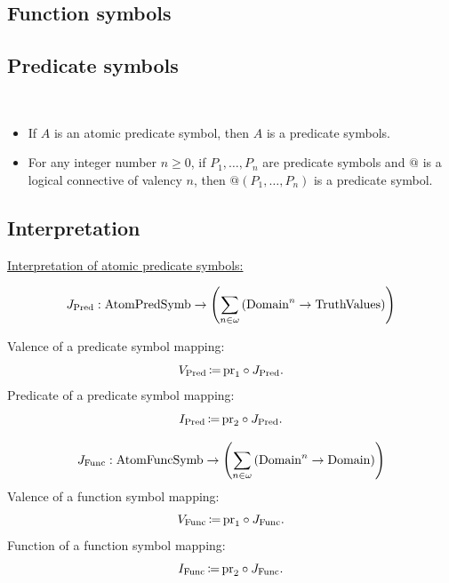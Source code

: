 \subsection{Function symbols}
\subsection{Predicate symbols}
\begin{definition}\ 
\begin{itemize}
\item If $A$ is an atomic predicate symbol, then $A$ is a predicate symbols.
\item For any integer number $n\geq 0$, if $P_1,\dots,P_n$ are predicate symbols and $@$ is a logical connective of valency $n$, then $@(P_1,\dots,P_n)$ is a predicate symbol.
\end{itemize}
\end{definition}

\subsection{Interpretation}
\underline{Interpretation of atomic predicate symbols:}
\begin{premise}%
\[
J_{\textrm{Pred}}:\mathrm{AtomPredSymb}\to\left(\sum_{n\in\omega}\left(\mathrm{Domain}^n\to\mathrm{TruthValues}\right)\right)
\]

Valence of a predicate symbol mapping:
\[
V_{\textrm{Pred}} \,{\coloneqq}\, \mathrm{pr}_1 \circ J_{\textrm{Pred}}.
\]
Predicate of a predicate symbol mapping:
\[
I_{\textrm{Pred}} \,{\coloneqq}\, \mathrm{pr}_2 \circ J_{\textrm{Pred}}.
\]
\end{premise}

\begin{premise}%
\[
J_{\textrm{Func}}:\mathrm{AtomFuncSymb}\to\left(\sum_{n\in\omega}
\left(\mathrm{Domain}^n
\to
\mathrm{Domain}
\right)
\right)
\]
Valence of a function symbol mapping:
\[
V_{\textrm{Func}} \,{\coloneqq}\, \mathrm{pr}_1 \circ J_{\textrm{Func}}.
\]
Function of a function symbol mapping:
\[
I_{\textrm{Func}} \,{\coloneqq}\, \mathrm{pr}_2 \circ J_{\textrm{Func}}.
\]
\end{premise}

